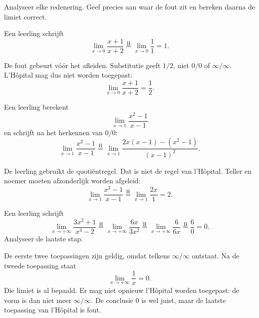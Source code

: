 \documentclass{ximera}
\begin{document}
\begin{oefening}{\oefU\ESS}

Analyseer elke redenering. Geef precies aan waar de fout zit en bereken
daarna de limiet correct.

\begin{question}
Een leerling schrijft
\[\lim_{x\to0}\frac{x+1}{x+2}\overset{\mathrm H}{=}\lim_{x\to0}\frac11=1.\]

\begin{oplossing}
De fout gebeurt vóór het afleiden. Substitutie geeft \(1/2\), niet
\(0/0\) of \(\infty/\infty\). L'Hôpital mag dus niet worden toegepast:
\[\lim_{x\to0}\frac{x+1}{x+2}=\frac12.\]
\end{oplossing}
\end{question}

\begin{question}
Een leerling berekent
\[\lim_{x\to1}\frac{x^2-1}{x-1}\]
en schrijft na het herkennen van \(0/0\):
\[\lim_{x\to1}\frac{x^2-1}{x-1}\overset{\mathrm H}{=}\lim_{x\to1}\frac{2x(x-1)-(x^2-1)}{(x-1)^2}.\]

\begin{oplossing}
De leerling gebruikt de quotiëntregel. Dat is niet de regel van
l'Hôpital. Teller en noemer moeten afzonderlijk worden afgeleid:
\[\lim_{x\to1}\frac{x^2-1}{x-1}\overset{\mathrm H}{=}\lim_{x\to1}\frac{2x}{1}=2.\]
\end{oplossing}
\end{question}

\begin{question}
Een leerling schrijft
\[\lim_{x\to+\infty}\frac{3x^2+1}{x^3-2}\overset{\mathrm H}{=}\lim_{x\to+\infty}\frac{6x}{3x^2}\overset{\mathrm H}{=}\lim_{x\to+\infty}\frac6{6x}\overset{\mathrm H}{=}\frac60=0.\]
Analyseer de laatste stap.

\begin{oplossing}
De eerste twee toepassingen zijn geldig, omdat telkens
\(\infty/\infty\) ontstaat. Na de tweede toepassing staat
\[\lim_{x\to+\infty}\frac1x=0.\]
Die limiet is al bepaald. Er mag niet opnieuw l'Hôpital worden toegepast:
de vorm is dan niet meer \(\infty/\infty\). De conclusie \(0\) is wel
juist, maar de laatste toepassing van l'Hôpital is fout.
\end{oplossing}
\end{question}
\end{oefening}
\end{document}
